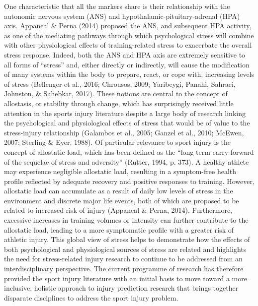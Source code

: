 \documentclass[
  english,
  man,floatsintext]{apa6}
\begin{document}
One characteristic that all the markers share is their relationship with the autonomic nervous system (ANS) and hypothalamic-pituitary-adrenal (HPA) axis.
Appaneal \& Perna (2014) proposed the ANS, and subsequent HPA activity, as one of the mediating pathways through which psychological stress will combine with other physiological effects of training-related stress to exacerbate the overall stress response.
Indeed, both the ANS and HPA axis are extremely sensitive to all forms of \enquote{stress} and, either directly or indirectly, will cause the modification of many systems within the body to prepare, react, or cope with, increasing levels of stress (Bellenger et al., 2016; Chrousos, 2009; Yaribeygi, Panahi, Sahraei, Johnston, \& Sahebkar, 2017).
These notions are central to the concept of allostasis, or stability through change, which has surprisingly received little attention in the sports injury literature despite a large body of research linking the psychological and physiological effects of stress that would be of value to the stress-injury relationship (Galambos et al., 2005; Ganzel et al., 2010; McEwen, 2007; Sterling \& Eyer, 1988).
Of particular relevance to sport injury is the concept of allostatic load, which has been defined as the \enquote{long-term carry-forward of the sequelae of stress and adversity} (Rutter, 1994, p. 373).
A healthy athlete may experience negligible allostatic load, resulting in a symptom-free health profile reflected by adequate recovery and positive responses to training.
However, allostatic load can accumulate as a result of daily low levels of stress in the environment and discrete major life events, both of which are proposed to be related to increased risk of injury (Appaneal \& Perna, 2014).
Furthermore, excessive increases in training volumes or intensity can further contribute to the allostatic load, leading to a more symptomatic profile with a greater risk of athletic injury.
This global view of stress helps to demonstrate how the effects of both psychological and physiological sources of stress are related and highlights the need for stress-related injury research to continue to be addressed from an interdisciplinary perspective.
The current programme of research has therefore provided the sport injury literature with an initial basis to move toward a more inclusive, holistic approach to injury prediction research that brings together disparate disciplines to address the sport injury problem.
\end{document}
